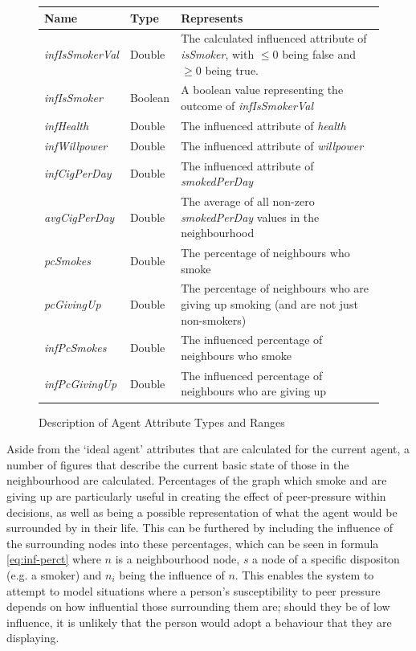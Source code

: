 \documentclass[]{report}
\begin{document}
\begin{figure}
\begin{center}

\begin{tabular}{|l||l|p{10cm}|}
\hline
\bf{Name} & \bf{Type} & \bf{Represents}\\
\hline
\emph{infIsSmokerVal} 	& Double 	&	The calculated influenced attribute of \emph{isSmoker}, with $\leq 0$ being false and $\geq 0$ being true.									\\
\emph{infIsSmoker}			&	Boolean	&	A boolean value representing the outcome of \emph{infIsSmokerVal}							\\
\emph{infHealth}				&	Double	&	The influenced attribute of \emph{health} \\
\emph{infWillpower}		&	Double	&	The influenced attribute of \emph{willpower}										\\
\emph{infCigPerDay}		&	Double	&	The influenced attribute of \emph{smokedPerDay}						\\
\emph{avgCigPerDay}		&	Double	&	The average of all non-zero \emph{smokedPerDay} values in the neighbourhood				\\
\emph{pcSmokes}				&	Double	&	The percentage of neighbours who smoke\\
\emph{pcGivingUp}			&	Double	&	The percentage of neighbours who are giving up smoking (and are not just non-smokers)\\
\emph{infPcSmokes}			&	Double	&	The influenced percentage of neighbours who smoke								\\
\emph{infPcGivingUp}		&	Double	&	The influenced percentage of neighbours who are giving up							\\
\hline
\end{tabular}
\end{center}
\caption{Description of Agent Attribute Types and Ranges}
\label{tab:neighbour}
\end{figure}

Aside from the `ideal agent' attributes that are calculated for the current agent, a number of figures that describe the current basic state of those in the neighbourhood are calculated. Percentages of the graph which smoke and are giving up are particularly useful in creating the effect of peer-pressure within decisions, as well as being a possible representation of what the agent would be surrounded by in their life. This can be furthered by including the influence of the surrounding nodes into these percentages, which can be seen in formula \ref{eq:inf-perct} where $n$ is a neighbourhood node, $s$ a node of a specific dispositon (e.g. a smoker) and $n_{i}$ being the influence of $n$. This enables the system to attempt to model situations where a person's susceptibility to peer pressure depends on how influential those surrounding them are; should they be of low influence, it is unlikely that the person would adopt a behaviour that they are displaying.
\end{document}
